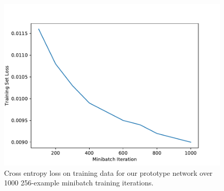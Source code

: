 \begin{figure}
\includegraphics[width=\columnwidth]{img/loss}
\caption{
Cross entropy loss on training data for our prototype network over 1000 256-example minibatch training iterations.
}
\label{fig:loss}
\end{figure}